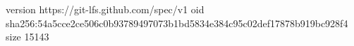 version https://git-lfs.github.com/spec/v1
oid sha256:54a5cce2ce506c0b93789497073b1bd5834e384c95c02def17878b919bc928f4
size 15143
